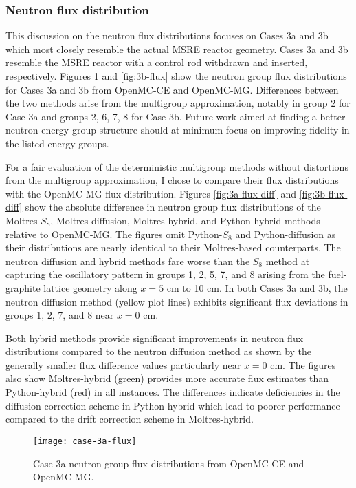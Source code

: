\subsubsection{Neutron flux distribution}

This discussion on the neutron flux distributions focuses on Cases 3a and 3b which most closely
resemble the actual \gls{MSRE} reactor geometry. Cases 3a and 3b resemble the \gls{MSRE} reactor
with a control rod withdrawn and inserted, respectively. Figures \ref{fig:3a-flux} and
\ref{fig:3b-flux} show the neutron group flux distributions for Cases 3a and 3b from OpenMC-CE and
OpenMC-MG. Differences between the two methods arise from the multigroup approximation, notably in
group 2 for Case 3a and groups 2, 6, 7, 8 for Case 3b. Future work aimed at finding a better
neutron energy group structure should at minimum focus on improving fidelity in the listed energy
groups.

For a fair evaluation of the deterministic multigroup methods without distortions from the
multigroup approximation, I chose to compare their flux distributions with the OpenMC-MG flux
distribution. Figures \ref{fig:3a-flux-diff} and \ref{fig:3b-flux-diff} show the absolute
difference in neutron group flux distributions of the Moltres-$S_8$, Moltres-diffusion,
Moltres-hybrid, and Python-hybrid methods relative to OpenMC-MG. The figures omit Python-$S_8$ and
Python-diffusion as their distributions are nearly identical to their Moltres-based counterparts.
The neutron diffusion and hybrid methods fare worse than the $S_8$ method at capturing the
oscillatory pattern in groups 1, 2, 5, 7, and 8 arising from the fuel-graphite lattice geometry
along $x=5$ cm to 10 cm. In both Cases 3a and 3b, the neutron diffusion method (yellow plot lines)
exhibits significant flux deviations in groups 1, 2, 7, and 8 near $x=0$ cm.

Both hybrid methods
provide significant improvements in neutron flux distributions compared to the neutron diffusion
method as shown by the generally smaller flux difference values particularly near $x=0$ cm. The
figures also show Moltres-hybrid (green) provides more accurate flux estimates than
Python-hybrid (red) in all instances. The differences indicate deficiencies in the diffusion
correction scheme in Python-hybrid which lead to poorer performance compared to the drift
correction scheme in Moltres-hybrid.

\begin{figure}[htb!]
  \centering
  \texttt{[image: case-3a-flux]}
  \caption{Case 3a neutron group flux distributions from OpenMC-CE and OpenMC-MG.}
  \label{fig:3a-flux}
\end{figure}


